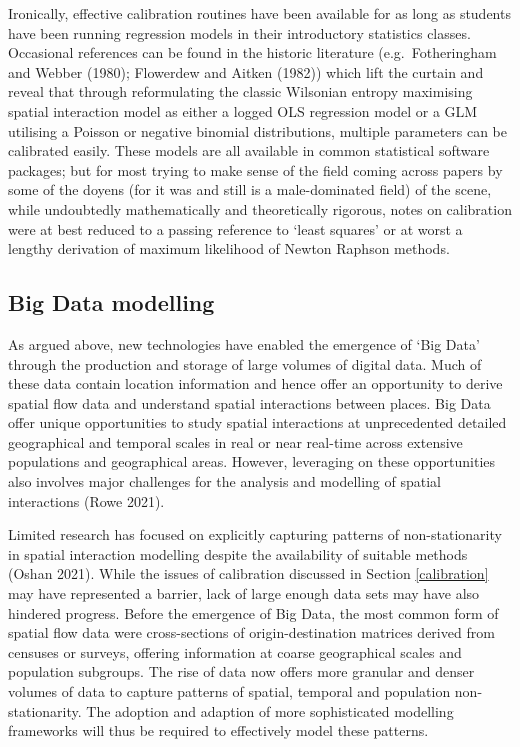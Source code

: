\documentclass[11pt,letterpaper]{article}
\begin{document}
Ironically, effective calibration routines have been available for as long as students have been running regression models in their introductory statistics classes.
Occasional references can be found in the historic literature (e.g.~Fotheringham and Webber (1980); Flowerdew and Aitken (1982)) which lift the curtain and reveal that through reformulating the classic Wilsonian entropy maximising spatial interaction model as either a logged OLS regression model or a GLM utilising a Poisson or negative binomial distributions, multiple parameters can be calibrated easily.
These models are all available in common statistical software packages; but for most trying to make sense of the field coming across papers by some of the doyens (for it was and still is a male-dominated field) of the scene, while undoubtedly mathematically and theoretically rigorous, notes on calibration were at best reduced to a passing reference to `least squares' or at worst a lengthy derivation of maximum likelihood of Newton Raphson methods.

\hypertarget{big-data-modelling}{%
\subsection{\texorpdfstring{Big Data modelling }{Big Data modelling }}\label{big-data-modelling}}

As argued above, new technologies have enabled the emergence of `Big Data' through the production and storage of large volumes of digital data.
Much of these data contain location information and hence offer an opportunity to derive spatial flow data and understand spatial interactions between places.
Big Data offer unique opportunities to study spatial interactions at unprecedented detailed geographical and temporal scales in real or near real-time across extensive populations and geographical areas.
However, leveraging on these opportunities also involves major challenges for the analysis and modelling of spatial interactions (Rowe 2021).

Limited research has focused on explicitly capturing patterns of non-stationarity in spatial interaction modelling despite the availability of suitable methods (Oshan 2021).
While the issues of calibration discussed in Section \ref{calibration} may have represented a barrier, lack of large enough data sets may have also hindered progress.
Before the emergence of Big Data, the most common form of spatial flow data were cross-sections of origin-destination matrices derived from censuses or surveys, offering information at coarse geographical scales and population subgroups.
The rise of data now offers more granular and denser volumes of data to capture patterns of spatial, temporal and population non-stationarity.
The adoption and adaption of more sophisticated modelling frameworks will thus be required to effectively model these patterns.
\end{document}
